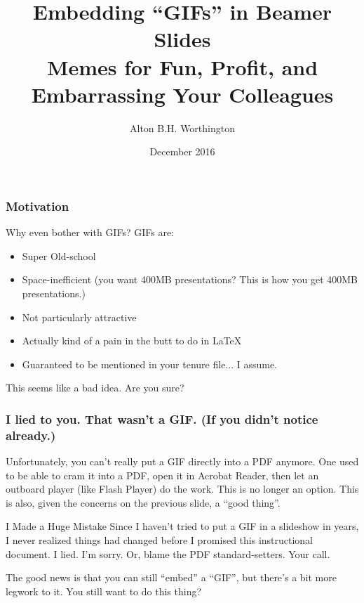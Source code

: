 \documentclass{beamer}
\title{Embedding ``GIFs'' in Beamer Slides \\ Memes for Fun, Profit, and Embarrassing Your Colleagues}
\author{Alton B.H. Worthington}
\institute{University of Michigan}
\date{December 2016}
\begin{document}
\usenavigationsymbolstemplate{}
\frame{\titlepage}

\begin{frame}
	\frametitle{Motivation}
	Why even bother with GIFs? GIFs are:
		\begin{itemize}
			\item Super Old-school
			\item Space-inefficient (you want 400MB presentations? This is how you get 400MB presentations.)
			\item Not particularly attractive
			\item Actually kind of a pain in the butt to do in \LaTeX
			\item Guaranteed to be mentioned in your tenure file... I assume.
		\end{itemize}
	This seems like a bad idea. Are you sure?
\end{frame}

\begin{frame}
	\begin{center}
	\end{center}
\end{frame}

\begin{frame}
	\frametitle{I lied to you. That wasn't a GIF. (If you didn't notice already.)}
	Unfortunately, you can't really put a GIF directly into a PDF anymore. One used to be able to cram it into a PDF, open it in Acrobat Reader, then let an outboard player (like Flash Player) do the work. This is no longer an option. This is also, given the concerns on the previous slide, a ``good thing''.
	\begin{block}{I Made a Huge Mistake}
		Since I haven't tried to put a GIF in a slideshow in years, I never realized things had changed before I promised this instructional document. I lied. I'm sorry. Or, blame the PDF standard-setters. Your call.
	\end{block}
	The good news is that you can still ``embed'' a ``GIF'', but there's a bit more legwork to it. You still want to do this thing?
\end{frame}
\end{document}

